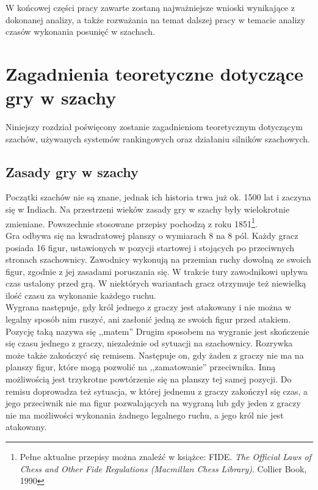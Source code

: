\documentclass[inzynierska]{pwr_wmat_praca_dyplomowa}
\theoremstyle{plain}
\numberwithin{theorem}{chapter}
\theoremstyle{definition}
\numberwithin{theorem}{chapter}
\begin{document}
W końcowej części pracy zawarte zostaną najważniejsze wnioski wynikające z dokonanej analizy, a także rozważania na temat dalszej pracy w temacie analizy czasów wykonania posunięć w szachach.

\chapter{Zagadnienia teoretyczne dotyczące gry w szachy}
Niniejszy rozdział poświęcony zostanie zagadnieniom teoretycznym dotyczącym szachów, używanych systemów rankingowych oraz działaniu silników szachowych.
\section{Zasady gry w szachy}
Początki szachów nie są znane, jednak ich historia trwa już ok. 1500 lat i zaczyna się w Indiach. Na przestrzeni wieków zasady gry w szachy były wielokrotnie zmieniane. Powszechnie stosowane przepisy pochodzą z roku 1851\footnote{Pełne aktualne przepisy można znaleźć w książce: FIDE. \textit{The Official Laws of Chess and Other Fide Regulations (Macmillan Chess Library)}. Collier Book, 1990}.\\

Gra odbywa się na kwadratowej planszy o wymiarach 8 na 8 pól. Każdy gracz posiada 16 figur, ustawionych w pozycji startowej i stojących po przeciwnych stronach szachownicy. Zawodnicy wykonują na przemian ruchy dowolną ze swoich figur, zgodnie z jej zasadami poruszania się. W trakcie tury zawodnikowi upływa czas ustalony przed grą. W niektórych wariantach gracz otrzymuje też niewielką ilość czasu za wykonanie każdego ruchu.\\

Wygrana następuje, gdy król jednego z graczy jest atakowany i nie można w legalny sposób nim ruszyć, ani zasłonić jedną ze swoich figur przed atakiem. Pozycję taką nazywa się ,,matem'' Drugim sposobem na wygranie jest skończenie się czasu jednego z graczy, niezależnie od sytuacji na szachownicy. 
Rozrywka może także zakończyć się remisem. Następuje on, gdy żaden z graczy nie ma na planszy figur, które mogą pozwolić na ,,zamatowanie'' przeciwnika. Inną możliwością jest trzykrotne powtórzenie się na planszy tej samej pozycji. Do remisu doprowadza też sytuacja, w której jednemu z graczy zakończył się czas, a jego przeciwnik nie ma figur pozwalających na wygraną lub gdy jeden z graczy nie ma możliwości wykonania żadnego legalnego ruchu, a jego król nie jest atakowany.
\end{document}

